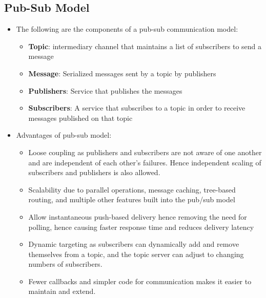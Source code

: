 \documentclass{article}
\begin{document}
\subsection{Pub-Sub Model}
\begin{itemize}
    \item The following are the components of a pub-sub communication model:
    \begin{itemize}
        \item \textbf{Topic}: intermediary channel that maintains a list of subscribers to send a message 
        
        \item \textbf{Message}: Serialized messages sent by a topic by publishers
        
        \item \textbf{Publishers}: Service that publishes the messages
        
        \item \textbf{Subscribers}: A service that subscribes to a topic in order to receive messages published on that topic
    \end{itemize}
    
    \item Advantages of pub-sub model:
    \begin{itemize}
        \item Loose coupling as publishers and subscribers are not aware of one another and are independent of each other's failures. Hence independent scaling of subscribers and publishers is also allowed.
        
        \item Scalability due to parallel operations, message caching, tree-based routing, and multiple other features built into the pub/sub model
        
        \item Allow instantaneous push-based delivery hence removing the need for polling, hence causing faster response time and reduces delivery latency
        
        \item Dynamic targeting as subscribers can dynamically add and remove themselves from a topic, and the topic server can adjust to changing numbers of subscribers.
        
        \item Fewer callbacks and simpler code for communication makes it easier to maintain and extend.
    \end{itemize}
\end{itemize}
\end{document}
